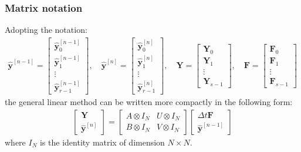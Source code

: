 \subsubsection{Matrix notation}
Adopting the notation:
\begin{align*}
\boldsymbol{\hat{y}}^{[n-1]}= \left[\begin{array}{c}
\boldsymbol{\hat{y}}^{[n-1]}_0\\
\boldsymbol{\hat{y}}^{[n-1]}_1\\
\vdots\\
\boldsymbol{\hat{y}}^{[n-1]}_{r-1}
\end{array}\right],\quad \boldsymbol{\hat{y}}^{[n]}= \left[\begin{array}{c}
\boldsymbol{\hat{y}}^{[n]}_0\\
\boldsymbol{\hat{y}}^{[n]}_1\\
\vdots\\
\boldsymbol{\hat{y}}^{[n]}_{r-1}
\end{array}\right],\quad \boldsymbol{Y}= \left[\begin{array}{c}
\boldsymbol{Y}_0\\
\boldsymbol{Y}_1\\
\vdots\\
\boldsymbol{Y}_{s-1}
\end{array}\right],\quad \boldsymbol{F}= \left[\begin{array}{c}
\boldsymbol{F}_0\\
\boldsymbol{F}_1\\
\vdots\\
\boldsymbol{F}_{s-1}
\end{array}\right]\quad
\end{align*}
the general linear method can be written more compactly in the following form:
\begin{align*}
\left[ \begin{array}{c} \boldsymbol{Y}\\
\boldsymbol{\hat{y}}^{[n]}
\end{array}\right] = \left[ \begin{array}{cc} A\otimes I_N & U\otimes I_N \\
B\otimes I_N & V\otimes I_N \end{array}\right] \left[ \begin{array}{c} \Delta
t\boldsymbol{F}\\
\boldsymbol{\hat{y}}^{[n-1]}
\end{array}\right]
\end{align*}
where $I_N$ is the identity matrix of dimension $N\times N$.


